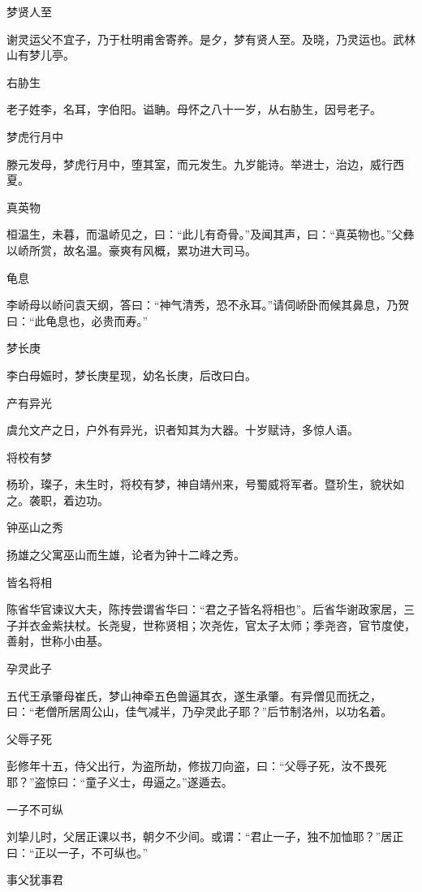 \documentclass[a4paper,12pt,UTF8,twoside]{ctexbook}
\begin{document}
    梦贤人至
    
    谢灵运父不宜子，乃于杜明甫舍寄养。是夕，梦有贤人至。及晓，乃灵运也。武林山有梦儿亭。
    
    右胁生
    
    老子姓李，名耳，字伯阳。谥聃。母怀之八十一岁，从右胁生，因号老子。
    
    梦虎行月中
    
    滕元发母，梦虎行月中，堕其室，而元发生。九岁能诗。举进士，治边，威行西夏。
    
    真英物
    
    桓温生，未暮，而温峤见之，曰：“此儿有奇骨。”及闻其声，曰：“真英物也。”父彝以峤所赏，故名温。豪爽有风概，累功进大司马。
    
    龟息
    
    李峤母以峤问袁天纲，答曰：“神气清秀，恐不永耳。”请伺峤卧而候其鼻息，乃贺曰：“此龟息也，必贵而寿。”
    
    梦长庚
    
    李白母娠时，梦长庚星现，幼名长庚，后改曰白。
    
    产有异光
    
    虞允文产之日，户外有异光，识者知其为大器。十岁赋诗，多惊人语。
    
    将校有梦
    
    杨玠，璨子，未生时，将校有梦，神自靖州来，号蜀威将军者。暨玠生，貌状如之。袭职，着边功。
    
    钟巫山之秀
    
    扬雄之父寓巫山而生雄，论者为钟十二峰之秀。
    
    皆名将相
    
    陈省华官谏议大夫，陈抟尝谓省华曰：“君之子皆名将相也”。后省华谢政家居，三子并衣金紫扶杖。长尧叟，世称贤相；次尧佐，官太子太师；季尧咨，官节度使，善射，世称小由基。
    
    孕灵此子
    
    五代王承肇母崔氏，梦山神牵五色兽逼其衣，遂生承肇。有异僧见而抚之，曰：“老僧所居周公山，佳气减半，乃孕灵此子耶？”后节制洛州，以功名着。
    
    父辱子死
    
    彭修年十五，侍父出行，为盗所劫，修拔刀向盗，曰：“父辱子死，汝不畏死耶？”盗惊曰：“童子义士，毋逼之。”遂遁去。
    
    一子不可纵
    
    刘挚儿时，父居正课以书，朝夕不少间。或谓：“君止一子，独不加恤耶？”居正曰：“正以一子，不可纵也。”
    
    事父犹事君
    
\end{document}
